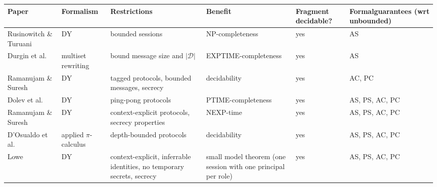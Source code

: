 
\begin{table}[h!]
\small
\centering
\begin{tabular}{|p{2cm}|p{1.8cm}p{2.6cm}p{2.8cm}p{1.72cm}p{2.6cm}|}
\hline
\textbf{Paper} &
\textbf{Formalism} &
\textbf{Restrictions} &
\textbf{Benefit} &
\textbf{Fragment decidable?} &
\textbf{Formal}\newline\textbf{guarantees} \newline (wrt unbounded) \\
\hline

\rowcolor{grouponeDark}
Rusinowitch \& Turuani \cite{bounded_sessions} & DY & bounded sessions & NP-completeness & yes & AS \\ 

\rowcolor{grouponeLight}
Durgin et al. \cite{bounded_undecidable} & multiset rewriting & bound message size and $|\mathcal{D}|$ & EXPTIME-completeness & yes & AS \\

\rowcolor{grouponeDark}
Ramanujam \& Suresh \cite{tagged_bounded_secrecy} & DY & tagged protocols, bounded messages, secrecy & decidability & yes & AC, PC \\

\hhline{|======|}

\rowcolor{grouptwoDark}
Dolev et al. \cite{pingpong} & DY & ping-pong \cite{pingpong} protocols & PTIME-completeness & yes & AS, PS, AC, PC \\ 

\rowcolor{grouptwoLight}
Ramanujam \& Suresh \cite{context_explicit} & DY & context-explicit \cite{context_explicit} protocols, secrecy properties & NEXP-time & yes & AS, PS, AC, PC \\

\rowcolor{grouptwoDark}
D'Osualdo et al. \cite{depth_bounded} & applied $\pi$-calculus & depth-bounded protocols \cite{depth_bounded} & decidability & yes & AS, PS, AC, PC \\

\rowcolor{grouptwoLight}
Lowe \cite{small_model} & DY & context-explicit, inferrable identities, no temporary secrets, secrecy & small model theorem (one session with one principal per role) & yes & AS, PS, AC, PC \\


\end{tabular}
\end{table}
